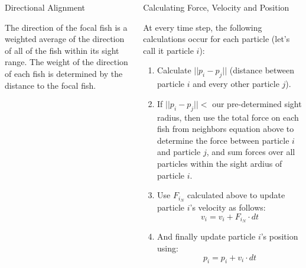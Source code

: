 \documentclass[final, xcolor=dvipsnames]{beamer}
\newlength{\onecolwid}
\newlength{\twocolwid}
\begin{document}
\begin{frame}[t]
\begin{columns}[t]
\begin{column}{\twocolwid}
\begin{columns}[t,totalwidth=\twocolwid]
\begin{column}{\onecolwid}
\begin{block}{Directional Alignment}
\begin{figure}
	\end{figure}
The direction of the focal fish is a weighted average of the direction of all of the fish within its sight range.  The weight of the direction of each fish is determined by the distance to the focal fish.


\end{block}


\end{column} %

\begin{column}{\onecolwid} %


\begin{block}{Calculating Force, Velocity and Position}

At every time step, the following calculations occur for each particle (let's call it particle $i$):
\begin{enumerate}
	\item Calculate $|| p_{i} - p_{j}||$ (distance between particle $i$ and every other particle $j$).
	\item If $||p_{i} - p_{j}|| <$ our pre-determined sight radius, then use the total force on each fish from neighbors equation above to determine the force between particle $i$ and particle $j$, and sum forces over all particles within the sight ardius of particle $i$.
	\item Use $F_{i_{N}}$ calculated above to update particle $i$'s velocity as follows:
		\begin{equation*}
			v_{i} = v_{i} + F_{i_{N}}\cdot dt
		\end{equation*}
	\item And finally update particle $i$'s position using:
		\begin{equation*}
			p_{i} = p_{i} + v_{i} \cdot dt
		\end{equation*}
\end{enumerate}


\end{block}
\end{column}
\end{columns}
\end{column}
\end{columns}
\end{frame}
\end{document}
